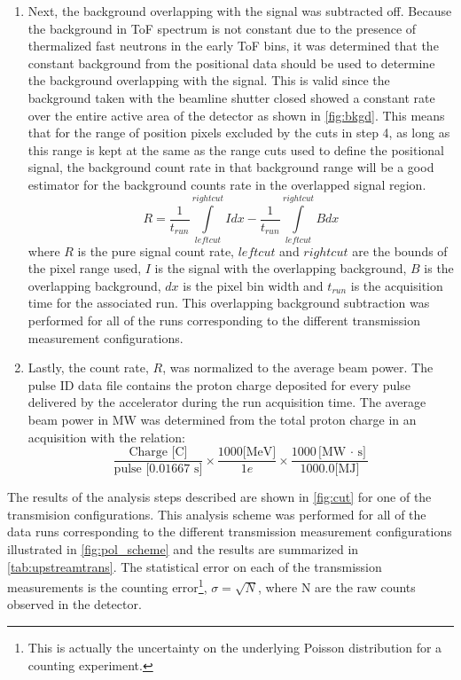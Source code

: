 \begin{enumerate}
    \item Next, the background overlapping with the signal was subtracted off. Because the background in ToF spectrum is not constant due to the presence of thermalized fast neutrons in the early ToF bins, it was determined that the constant background from the positional data should be used to determine the background overlapping with the signal. This is valid since the background taken with the beamline shutter closed showed a constant rate over the entire active area of the detector as shown in \cref{fig:bkgd}. This means that for the range of position pixels excluded by the cuts in step 4, as long as this range is kept at the same as the range cuts used to define the positional signal, the background count rate in that background range will be a good estimator for the background counts rate in the overlapped signal region.
    \begin{equation}
        R = \frac{1}{t_{run}} \int\limits_{left cut}^{right cut} I dx - \frac{1}{t_{run}} \int\limits_{left cut}^{right cut} B dx
    \end{equation}
    where $R$ is the pure signal count rate, $leftcut$ and $rightcut$ are the bounds of the pixel range used, $I$ is the signal with the overlapping background, $B$ is the overlapping background, $dx$ is the pixel bin width and $t_{run}$ is the acquisition time for the associated run. This overlapping background subtraction was performed for all of the runs corresponding to the different transmission measurement configurations.
    \item Lastly, the count rate, $R$, was normalized to the average beam power. The pulse ID data file contains the proton charge deposited for every pulse delivered by the accelerator during the run acquisition time. The average beam power in MW was determined from the total proton charge in an acquisition with the relation:
    \begin{equation}
    \frac{\text{Charge [C]}}{\text{pulse [0.01667 s]}} \times  \frac{1000 \text{[MeV]}}{1 e} \times \frac{1000 \text{[MW $\cdot$ s]}}{1000.0 \text{[MJ]}} 
    \end{equation}

\end{enumerate}

The results of the analysis steps described are shown in \cref{fig:cut} for one of the transmision configurations. This analysis scheme was performed for all of the data runs corresponding to the different transmission measurement configurations illustrated in \cref{fig:pol_scheme} and the results are summarized in \cref{tab:upstreamtrans}. The statistical error on each of the transmission measurements is the counting error\footnote{This is actually the uncertainty on the underlying Poisson distribution for a counting experiment.}, $\sigma = \sqrt{N}$, where N are the raw counts observed in the detector.

